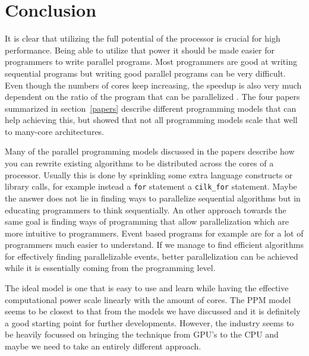 \section{Conclusion}


It is clear that utilizing the full potential of the processor is crucial for
high performance. Being able to utilize that power it should be made easier for
programmers to write parallel programs. Most programmers are good at writing
sequential programs but writing good parallel programs can be very difficult.
Even though the numbers of cores keep increasing, the speedup is also very much
dependent on the ratio of the program that can be parallelized
\cite{hennessy2007computer}. The four papers summarized in section~\ref{papers}
describe different programming models that can help achieving this, but
\cite{CaoPerformanceAnalysis} showed that not all programming models scale that
well to many-core architectures.

Many of the parallel programming models discussed in the papers describe how
you can rewrite existing algorithms to be distributed across the cores of a
processor. Usually this is done by sprinkling some extra language constructs or
library calls, for example instead a \texttt{for} statement a
\texttt{cilk\_for} statement. Maybe the answer does not lie in finding ways to parallelize sequential algorithms but in educating programmers to think sequentially. An other approach towards the same goal is finding ways of programming that allow parallelization which are more intuitive to programmers. Event based programs for example are for a lot of programmers much easier to understand. If we manage to find efficient algorithms for effectively finding parallelizable events, better parallelization can be achieved while it is essentially coming from the programming level. 

The ideal model is one that is easy to use and learn while having the effective computational power scale linearly with the amount of cores. 
The PPM model seems to be closest to that from the models we have discussed and it is definitely a good starting point for further developments. 
However, the industry seems to be heavily focussed on bringing the technique from GPU's to the CPU and maybe we need to take an entirely different approach. 